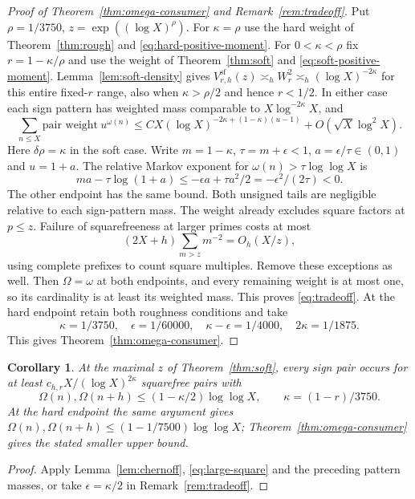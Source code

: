 \documentclass[11pt]{article}
\newtheorem{corollary}[theorem]{Corollary}
\theoremstyle{definition}
\theoremstyle{remark}
\numberwithin{equation}{section}
\newcommand{\sfw}{\mathrm{sf}}
\begin{document}
\begin{proof}[Proof of Theorem~\ref{thm:omega-consumer} and Remark~\ref{rem:tradeoff}]
Put $\rho=1/3750$, $z=\exp((\log X)^\rho)$.
For $\kappa=\rho$ use the hard weight of Theorem~\ref{thm:rough} and \eqref{eq:hard-positive-moment}.
For $0<\kappa<\rho$ fix $r=1-\kappa/\rho$ and use the weight of Theorem~\ref{thm:soft} and
\eqref{eq:soft-positive-moment}. Lemma~\ref{lem:soft-density} gives
$V^{\sfw}_{r,h}(z)\asymp_h W_r^2\asymp_h(\log X)^{-2\kappa}$ for this entire fixed-$r$ range, also when
$\kappa>\rho/2$ and hence $r<1/2$.
In either case each sign pattern has weighted mass comparable to $X\log^{-2\kappa}X$, and
\begin{equation}\label{eq:tradeoff-moment}
 \sum_{n\le X}\text{pair weight}\ u^{\omega(n)}
 \le CX(\log X)^{-2\kappa+(1-\kappa)(u-1)}+O(\sqrt X\log^2X).
\end{equation}
Here $\delta\rho=\kappa$ in the soft case.
Write $m=1-\kappa$, $\tau=m+\epsilon<1$, $a=\epsilon/\tau\in(0,1)$ and $u=1+a$.
The relative Markov exponent for $\omega(n)>\tau\log\log X$ is
\begin{equation}\label{eq:tradeoff-tail}
 ma-\tau\log(1+a)\le-\epsilon a+\tau a^2/2=-\epsilon^2/(2\tau)<0.
\end{equation}
The other endpoint has the same bound. Both unsigned tails are negligible relative to each sign-pattern mass.
The weight already excludes square factors at $p\le z$.
Failure of squarefreeness at larger primes costs at most
\begin{equation}\label{eq:large-square}
 (2X+h)\sum_{m>z}m^{-2}=O_h(X/z),
\end{equation}
using complete prefixes to count square multiples. Remove these exceptions as well. Then $\Omega=\omega$ at
both endpoints, and every remaining weight is at most one, so its cardinality is at least its weighted mass.
This proves \eqref{eq:tradeoff}. At the hard endpoint retain both roughness conditions and take
\begin{equation}\label{eq:tradeoff-numerical}
 \kappa=1/3750,\quad\epsilon=1/60000,\quad
 \kappa-\epsilon=1/4000,\quad 2\kappa=1/1875.
\end{equation}
This gives Theorem~\ref{thm:omega-consumer}.
\end{proof}

\begin{corollary}\label{cor:half-consumer}
At the maximal $z$ of Theorem~\ref{thm:soft}, every sign pair occurs for at least
$c_{h,r}X/(\log X)^{2\kappa}$ squarefree pairs with
\begin{equation}\label{eq:soft-half-consumer}
 \Omega(n),\Omega(n+h)\le(1-\kappa/2)\log\log X,\qquad\kappa=(1-r)/3750.
\end{equation}
At the hard endpoint the same argument gives $\Omega(n),\Omega(n+h)\le(1-1/7500)\log\log X$;
Theorem~\ref{thm:omega-consumer} gives the stated smaller upper bound.
\end{corollary}
\begin{proof}
Apply Lemma~\ref{lem:chernoff}, \eqref{eq:large-square} and the preceding pattern masses, or take
$\epsilon=\kappa/2$ in Remark~\ref{rem:tradeoff}.
\end{proof}
\end{document}
